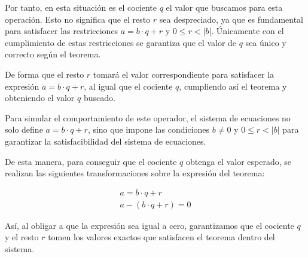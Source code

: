 \documentclass[a4paper,12pt]{report}
\begin{document}
	\vspace{0.3cm}
	\noindent Por tanto, en esta situación es el cociente $q$ el valor que buscamos para esta operación. Esto no significa que el resto $r$ sea despreciado, ya que es fundamental para satisfacer las restricciones  $a = b \cdot q + r $ y $0 \leq r < |b|$. Únicamente con el cumplimiento de estas restricciones se garantiza que el valor de $q$ sea único y correcto según el teorema.
	
	\vspace{0.3cm}
	\noindent De forma que el resto $r$ tomará el valor correspondiente para satisfacer la expresión $a = b \cdot q + r $, al igual que el cociente $q$, cumpliendo así el teorema y obteniendo el valor $q$ buscado.
	
	
	\vspace{0.3cm}
	\noindent Para simular el comportamiento de este operador, el sistema de ecuaciones no solo define $a = b \cdot q + r $, sino que impone las condiciones $b \neq 0$ y $0 \leq r < |b|$ para garantizar la satisfacibilidad del sistema de ecuaciones.
	
	\vspace{0.3cm}
	\noindent De esta manera, para conseguir que el cociente $q$ obtenga el valor esperado, se realizan las siguientes transformaciones sobre la expresión del teorema: 
	
	\begin{align}
		a = b \cdot q + r \\
		a - (b \cdot q + r) = 0 
	\end{align}
	
	\vspace{0.3cm}
	\noindent Así, al obligar a que la expresión sea igual a cero, garantizamos que el cociente $q$ y el resto $r$ tomen los valores exactos que satisfacen el teorema dentro del sistema.
	
\end{document}
